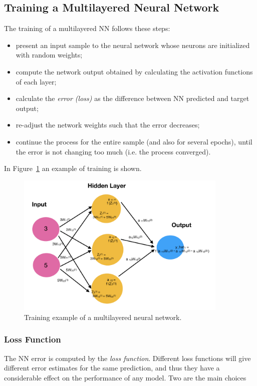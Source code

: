 \subsection{Training a Multilayered Neural Network}
\label{training-a-multilayered-neural-network}

The training of a multilayered NN follows these steps:

\begin{itemize}
\tightlist
\item present an input sample to the neural network whose neurons are initialized with random weights;
\item compute the network output obtained by calculating the activation functions of each layer;
\item calculate the \emph{error (loss)} as the difference between NN predicted and target output;
\item re-adjust the network weights such that the error decreases;
\item continue the process for the entire sample (and also for several epochs), until the error is not changing too much (i.e. the process converged).
\end{itemize}
In Figure~\ref{fig:training} an example of training is shown.

\begin{figure}[htb]
\centering
\includegraphics[width=0.9\textwidth]{figures/training_nn}
\caption{Training example of a multilayered neural network.}
\label{fig:training}
\end{figure}

\subsubsection{Loss Function}
The NN error is computed by the \emph{loss function}. Different loss functions will give different error estimates for the same prediction, and thus they have a considerable effect on the performance of any model. Two are the main choices


